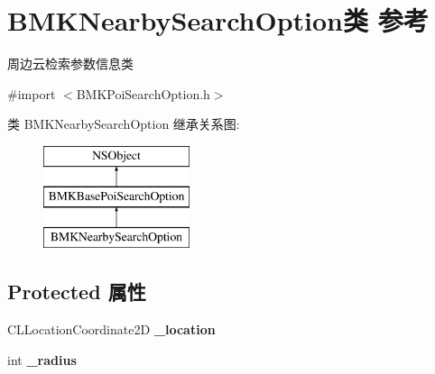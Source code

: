 \hypertarget{interface_b_m_k_nearby_search_option}{}\section{B\+M\+K\+Nearby\+Search\+Option类 参考}
\label{interface_b_m_k_nearby_search_option}


周边云检索参数信息类  




{\ttfamily \#import $<$B\+M\+K\+Poi\+Search\+Option.\+h$>$}

类 B\+M\+K\+Nearby\+Search\+Option 继承关系图\+:\begin{figure}[H]
\begin{center}
\leavevmode
\includegraphics[height=3.000000cm]{interface_b_m_k_nearby_search_option}
\end{center}
\end{figure}
\subsection*{Protected 属性}
\begin{DoxyCompactItemize}
\item 
\hypertarget{interface_b_m_k_nearby_search_option_aa9be54322f66430b9f11d1259224b037}{}C\+L\+Location\+Coordinate2\+D {\bfseries \+\_\+location}\label{interface_b_m_k_nearby_search_option_aa9be54322f66430b9f11d1259224b037}

\item 
\hypertarget{interface_b_m_k_nearby_search_option_a90c1dbf1f976af8e3b80e7fe86e1ca98}{}int {\bfseries \+\_\+radius}\label{interface_b_m_k_nearby_search_option_a90c1dbf1f976af8e3b80e7fe86e1ca98}

\end{DoxyCompactItemize}
